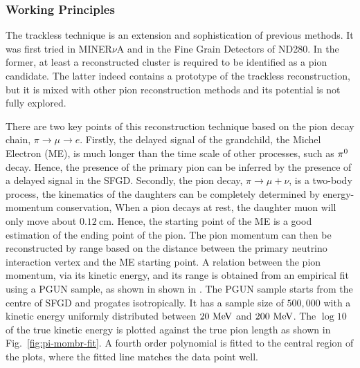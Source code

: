        \subsubsection{Working Principles}
         The trackless technique is an extension and sophistication of previous methods. 
         It was first tried in MINER$\nu$A\cite{MINERVAPOSTER} and in the Fine Grain Detectors of ND280\cite{T2KPOSTER}. 
         In the former, at least a reconstructed cluster is required to be identified as a pion candidate. 
         The latter indeed contains a prototype of the trackless reconstruction, but it is mixed with other pion reconstruction methods and its potential is not fully explored. 
    
         There are two key points of this reconstruction technique based on the pion decay chain, $\pi \rightarrow \mu \rightarrow e$.
         Firstly, the delayed signal of the grandchild, the Michel Electron (ME), is much longer than the time scale of other processes, such as $\pi^0$ decay.
         Hence, the presence of the primary pion can be inferred by the presence of a delayed signal in the SFGD.
         Secondly, the pion decay, $\pi \rightarrow \mu + \nu$, is a two-body process, the kinematics of the daughters can be completely determined by energy-momentum conservation, 
         When a pion decays at rest, the daughter muon will only move about $0.12~\textrm{cm}$. Hence, the starting point of the ME is a good estimation of the ending point of the pion.
         The pion momentum can then be reconstructed by range based on the distance between the primary neutrino interaction vertex and the ME starting point. 
         A relation between the pion momentum, via its kinetic energy, and its range is obtained from an empirical fit using a PGUN sample, as shown in shown in .
          The PGUN sample starts from the centre of SFGD and progates isotropically.
          It has a sample size of $500,000$ with a kinetic energy uniformly distributed between $20~\textrm{MeV}$ and $200~\textrm{MeV}$.
          The $\log10$ of the true kinetic energy is plotted against the true pion length as shown in Fig.~\ref{fig:pi-mombr-fit}.
          A fourth order polynomial is fitted to the central region of the plots, where the fitted line matches the data point well.

